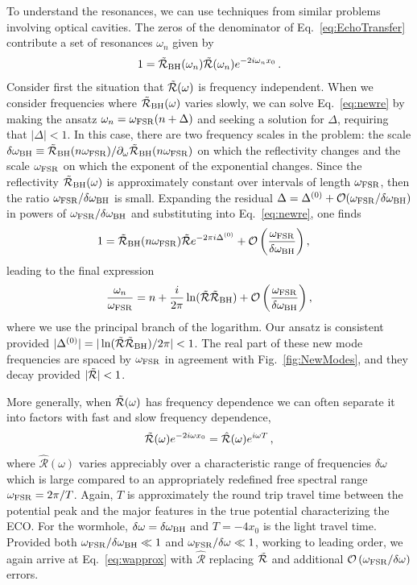 \begin{refsection}
To understand the resonances, we can use techniques from similar problems involving optical cavities. 
The zeros of the denominator of Eq.~\eqref{eq:EchoTransfer} contribute a set of resonances $\omega_n$ given by
\begin{align}
1=\tilde{\mathcal R}_{\rm BH}(\omega_n)\tilde{\mathcal R}(\omega_n)e^{-2i\omega_n x_0} \,. \label{eq:newre}
\end{align}
Consider first the situation that $\tilde{\mathcal R}(\omega)$ is frequency independent.
When we consider frequencies where $\tilde{\mathcal R}_{\rm BH}(\omega)$ varies slowly, we can solve Eq.~\eqref{eq:newre} by making the ansatz $\omega_n =\omega_{\rm FSR}(n+\Delta)$ and seeking a solution for $\Delta$, requiring that $|\Delta| < 1$.
In this case, there are two frequency scales in the problem: the scale $\delta \omega_{\rm BH} \equiv \tilde{\mathcal R}_{\rm BH}(n\omega_{\rm FSR})/\partial_{\omega}\tilde{\mathcal R}_{\rm BH}(n\omega_{\rm FSR})$ on which the reflectivity changes and the scale $\omega_{\rm FSR}$ on which the exponent of the exponential changes.
Since the reflectivity $\tilde{\mathcal R}_{\rm BH}(\omega)$ is approximately constant over intervals of length $\omega_{\rm FSR}$, then the ratio $\omega_{\rm FSR}/\delta \omega_{\rm BH}$ is small. 
Expanding the residual $\Delta=\Delta^{(0)}+\mathcal{O}(\omega_{\rm FSR}/\delta \omega_{\rm BH})$ in powers of $\omega_{\rm FSR}/\delta \omega_{\rm BH}$ and substituting into Eq.~\eqref{eq:newre}, one finds
\begin{align}
&1=\tilde{\mathcal R}_{\rm BH}(n\omega_{\rm FSR})\tilde{\mathcal R} e^{-2\pi i\Delta^{(0)}}+\mathcal{O}\left(\frac{\omega_{\rm FSR}}{\delta \omega_{\rm BH}}\right),
\end{align}
leading to the final expression
\begin{align}
 \frac{\omega_n}{\omega_{\rm FSR}} = n +  \frac{i}{2\pi} \ln(\tilde{\mathcal R}\tilde{\mathcal R}_{\rm BH})+\mathcal{O}\left(\frac{\omega_{\rm FSR}}{\delta \omega_{\rm BH}}\right), \label{eq:wapprox}
\end{align}
where we use the principal branch of the logarithm.
Our ansatz is consistent provided $|\Delta^{(0)}| =|\ln(\tilde{\mathcal R}\tilde{\mathcal R}_{\rm BH})/2\pi|<1$.
The real part of these new mode frequencies are spaced by $\omega_{\rm FSR}$ in agreement with Fig.~\ref{fig:NewModes}, and they decay provided $|\tilde{\mathcal R}|<1$.

More generally, when $\tilde{\mathcal R}(\omega)$ has frequency dependence we can often separate it into factors with fast and slow frequency dependence,
\begin{align}
\tilde{\mathcal R}(\omega) e^{-2i\omega x_0} = \hat {\mathcal R}(\omega)e^{i\omega T} \,,
\end{align}
where $\hat{\mathcal R}(\omega)$ varies appreciably over a characteristic range of frequencies $\delta \omega$ which is large compared to an appropriately redefined free spectral range $\omega_{\rm FSR}=2\pi/T$. Again, $T$ 
is approximately the round trip travel time between the potential peak and the major features in the true potential characterizing the ECO. For the wormhole, $\delta \omega = \delta \omega_{\rm BH}$ and $T=-4x_0$ is the light travel time. Provided both $\omega_{\rm FSR}/\delta \omega_{\rm BH}  \ll 1$ and $\omega_{\rm FSR}/\delta \omega \ll 1$, working to leading order, we again arrive at Eq.~\eqref{eq:wapprox} with $\hat {\mathcal R}$ replacing $\tilde{\mathcal R}$ and additional $\mathcal{O}\left(\omega_{\rm FSR}/\delta \omega\right)$ errors.


\end{refsection}
